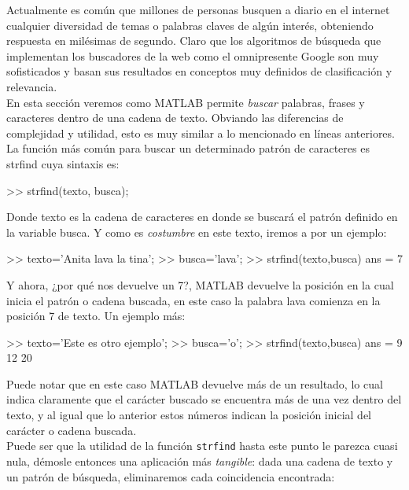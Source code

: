 Actualmente es común que millones de personas busquen a diario en el
internet cualquier diversidad de temas o palabras claves de algún
interés, obteniendo respuesta en milésimas de segundo. Claro que los
algoritmos de búsqueda que implementan los buscadores de la web como el
omnipresente Google son muy sofisticados y basan sus resultados en
conceptos muy definidos de clasificación y relevancia. \\

En esta sección veremos como MATLAB permite \emph{buscar} palabras,
frases y caracteres dentro de una cadena de texto. Obviando las
diferencias de complejidad y utilidad, esto es muy similar a lo
mencionado en líneas anteriores. \\

La función más común para buscar un determinado patrón de caracteres es
strfind cuya sintaxis es:

\begin{matlab}
>> strfind(texto, busca);
\end{matlab}

Donde texto es la cadena de caracteres en donde se buscará el patrón
definido en la variable busca. Y como es \emph{costumbre} en este texto,
iremos a por un ejemplo:

\begin{matlab}
>> texto='Anita lava la tina';
>> busca='lava';
>> strfind(texto,busca)
ans =
     7
\end{matlab}

Y ahora, ¿por qué nos devuelve un 7?, MATLAB devuelve la posición en la
cual inicia el patrón o cadena buscada, en este caso la palabra lava
comienza en la posición 7 de texto. Un ejemplo más:

\begin{matlab}
>> texto='Este es otro ejemplo';
>> busca='o';
>> strfind(texto,busca)
ans =
     9    12    20
\end{matlab}

Puede notar que en este caso MATLAB devuelve más de un resultado, lo
cual indica claramente que el carácter buscado se encuentra más de una
vez dentro del texto, y al igual que lo anterior estos números indican
la posición inicial del carácter o cadena buscada. \\

Puede ser que la utilidad de la función \texttt{strfind} hasta este punto le
parezca cuasi nula, démosle entonces una aplicación más \emph{tangible}:
dada una cadena de texto y un patrón de búsqueda, eliminaremos cada
coincidencia encontrada:

